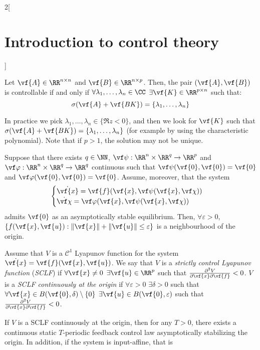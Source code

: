 \documentclass[../../../main_math.tex]{subfiles}
\begin{document}
\begin{multicols}{2}[\section{Introduction to control theory}]
\begin{theorem}
  \end{theorem}
  \begin{theorem}
    Let $\vf{A} \in \RR^{n\times n}$ and $\vf{B}\in \RR^{n\times p}$. Then, the pair $(\vf{A}, \vf{B})$ is controllable if and only if $\forall \lambda_1,\ldots,\lambda_n\in \CC$ $\exists \vf{K}\in \RR^{p\times n}$ such that: $$\sigma(\vf{A}+\vf{BK})=\{\lambda_1,\ldots,\lambda_n\}$$
  \end{theorem}
  \begin{remark}
    In practice we pick $\lambda_1,\ldots,\lambda_n\in \{\Re z<0\}$, and then we look for $\vf{K}$ such that $\sigma(\vf{A}+\vf{BK})= \{\lambda_1,\ldots,\lambda_n\}$ (for example by using the characteristic polynomial). Note that if $p>1$, the solution may not be unique.
  \end{remark}
  \begin{theorem}
    Suppose that there exists $q\in \NN$, $\vf\psi:\RR^n\times \RR^q \to \RR^p$ and $\vf\varphi:\RR^n\times \RR^q \to \RR^q$ continuous such that $\vf\psi(\vf{0}, \vf{0}) = \vf{0}$ and $\vf\varphi(\vf{0}, \vf{0}) = \vf{0}$. Assume, moreover, that the system
    \begin{equation*}
      \begin{cases}
        \dot{\vf{x}} = \vf{f}(\vf{x}, \vf\psi(\vf{x}, \vf\chi)) \\
        \dot{\vf\chi} = \vf\varphi(\vf{x}, \vf\psi(\vf{x}, \vf\chi))
      \end{cases}
    \end{equation*}
    admits $\vf{0}$ as an asymptotically stable equilibrium. Then, $\forall \varepsilon>0$, $\{f(\vf{x}, \vf{u}): \norm{\vf{x}}+\norm{\vf{u}}\leq \varepsilon\}$ is a neighbourhood of the origin.
  \end{theorem}
  \begin{definition}
    Assume that $V$ is a $\mathcal{C}^1$ Lyapunov function for the system $\dot{\vf{x}} = \vf{f}(\vf{x}, \vf{u})$. We say that $V$ is a \emph{strictly control Lyapunov function} (\emph{SCLF}) if $\forall\vf{x}\ne 0$ $\exists \vf{u}\in \RR^p$ such that $\pdv{V}{\vf{x}}\vf{f}(\vf{x}, \vf{u})<0$. $V$ is a \emph{SCLF continuously at the origin} if $\forall\varepsilon>0$ $\exists \delta>0$ such that $\forall \vf{x}\in B(\vf{0},\delta)\setminus\{0\}$ $\exists \vf{u}\in B(\vf{0},\varepsilon)$ such that $\pdv{V}{\vf{x}}\vf{f}(\vf{x}, \vf{u})<0$.
  \end{definition}
  \begin{theorem}
    If $V$ is a SCLF continuously at the origin, then for any $T>0$, there exists a continuous static $T$-periodic feedback control law asymptotically stabilizing the origin. In addition, if the system is input-affine, that is

\end{theorem}
\end{multicols}
\end{document}
